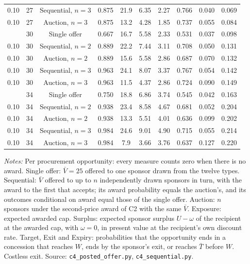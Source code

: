 \begin{table}[htbp]
{\begin{tabular}{cccccccccc}
0.10 & 27 & Sequential, $n = 3$ & 0.875 & 21.9 & 6.35 & 2.27 & 0.766 & 0.040 & 0.069\\
0.10 & 27 & Auction, $n = 3$ & 0.875 & 13.2 & 4.28 & 1.85 & 0.737 & 0.055 & 0.084\\
\addlinespace
0.10 & 30 & Single offer & 0.667 & 16.7 & 5.58 & 2.33 & 0.531 & 0.037 & 0.098\\
0.10 & 30 & Sequential, $n = 2$ & 0.889 & 22.2 & 7.44 & 3.11 & 0.708 & 0.050 & 0.131\\
0.10 & 30 & Auction, $n = 2$ & 0.889 & 15.6 & 5.58 & 2.86 & 0.687 & 0.070 & 0.132\\
0.10 & 30 & Sequential, $n = 3$ & 0.963 & 24.1 & 8.07 & 3.37 & 0.767 & 0.054 & 0.142\\
0.10 & 30 & Auction, $n = 3$ & 0.963 & 11.5 & 4.37 & 2.86 & 0.724 & 0.090 & 0.149\\
\addlinespace
0.10 & 34 & Single offer & 0.750 & 18.8 & 6.86 & 3.74 & 0.545 & 0.042 & 0.163\\
0.10 & 34 & Sequential, $n = 2$ & 0.938 & 23.4 & 8.58 & 4.67 & 0.681 & 0.052 & 0.204\\
0.10 & 34 & Auction, $n = 2$ & 0.938 & 13.3 & 5.51 & 4.01 & 0.636 & 0.099 & 0.202\\
0.10 & 34 & Sequential, $n = 3$ & 0.984 & 24.6 & 9.01 & 4.90 & 0.715 & 0.055 & 0.214\\
0.10 & 34 & Auction, $n = 3$ & 0.984 & 7.9 & 3.66 & 3.76 & 0.637 & 0.127 & 0.220\\
\bottomrule\end{tabular}}
\par\smallskip\begin{minipage}{\textwidth}\footnotesize\textit{Notes:} Per procurement opportunity: every measure counts zero when there is no award. Single offer: $\bar V = 25$ offered to one sponsor drawn from the twelve types. Sequential: $\bar V$ offered to up to $n$ independently drawn sponsors in turn, with the award to the first that accepts; its award probability equals the auction's, and its outcomes conditional on award equal those of the single offer. Auction: $n$ sponsors under the second-price award of C2 with the same $\bar V$. Exposure: expected awarded cap. Surplus: expected sponsor surplus $U - \omega$ of the recipient at the awarded cap, with $\omega = 0$, in present value at the recipient's own discount rate. Target, Exit and Expiry: probabilities that the opportunity ends in a concession that reaches $W$, ends by the sponsor's exit, or reaches $\bar T$ before $W$. Costless exit. Source: \texttt{c4\_posted\_offer.py}, \texttt{c4\_sequential.py}.\end{minipage}
\end{table}

